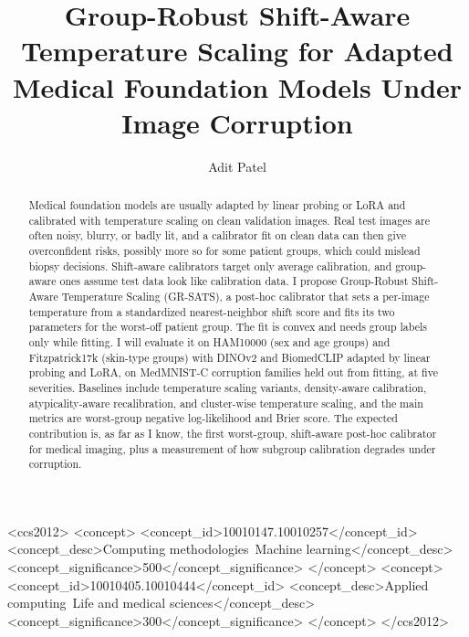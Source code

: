 \documentclass[sigconf,nonacm]{acmart}
\begin{document}
\title{Group-Robust Shift-Aware Temperature Scaling for Adapted Medical
  Foundation Models Under Image Corruption}

\author{Adit Patel}

\renewcommand{\shortauthors}{Patel}

\begin{abstract}
Medical foundation models are usually adapted by linear probing or LoRA
and calibrated with temperature scaling on clean validation images. Real
test images are often noisy, blurry, or badly lit, and a calibrator fit on
clean data can then give overconfident risks, possibly more so for some
patient groups, which could mislead biopsy decisions. Shift-aware
calibrators target only average calibration, and group-aware ones assume
test data look like calibration data. I propose Group-Robust Shift-Aware
Temperature Scaling (GR-SATS), a post-hoc calibrator that sets a per-image
temperature from a standardized nearest-neighbor shift score and fits its
two parameters for the worst-off patient group. The fit is convex and needs
group labels only while fitting. I will evaluate it on HAM10000 (sex and
age groups) and Fitzpatrick17k (skin-type groups) with DINOv2 and
BiomedCLIP adapted by linear probing and LoRA, on MedMNIST-C corruption
families held out from fitting, at five severities. Baselines include
temperature scaling variants, density-aware calibration,
atypicality-aware recalibration, and cluster-wise temperature scaling, and
the main metrics are worst-group negative log-likelihood and Brier score. The expected
contribution is, as far as I know, the first worst-group, shift-aware
post-hoc calibrator for medical imaging, plus a measurement of how subgroup
calibration degrades under corruption.
\end{abstract}

\begin{CCSXML}
<ccs2012>
 <concept>
  <concept_id>10010147.10010257</concept_id>
  <concept_desc>Computing methodologies~Machine learning</concept_desc>
  <concept_significance>500</concept_significance>
 </concept>
 <concept>
  <concept_id>10010405.10010444</concept_id>
  <concept_desc>Applied computing~Life and medical sciences</concept_desc>
  <concept_significance>300</concept_significance>
 </concept>
</ccs2012>
\end{CCSXML}
\end{document}
